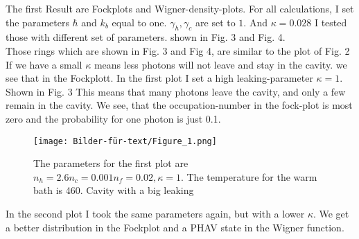 \documentclass[12pt,a4paper]{article}
\begin{document}
The first Result are Fockplots and Wigner-density-plots.
For all calculations, I set the parameters  $\hbar$ and $k_b$ equal to one. $\gamma_h, \gamma_c $ are set to $ 1$. And $\kappa=0.028$
I tested those with different set of parameters. 
shown in Fig. 3 and Fig. 4.\\
Those rings which are shown in Fig. 3 and Fig 4, are similar to the plot of Fig. 2
If we have a small $\kappa$ means less photons will not leave and stay in the cavity. we see that in the Fockplott.
In the first plot I set a high leaking-parameter $\kappa=1$. Shown in Fig. 3
This means that many photons leave the cavity, and only a few remain in the cavity. 
We see, that the occupation-number in the fock-plot is most zero and the probability for one photon is just 0.1.

\begin{figure}[hbtp]
\centering
\texttt{[image: Bilder-für-text/Figure\_1.png]}
\caption{The parameters for the first plot are$ n_h=2.6 n_c=0.001 n_f=0.02,\kappa=1$. The temperature for the warm bath is 460. Cavity with a big leaking}
\end{figure}\newpage

In the second plot I took the same parameters again, but with a lower $\kappa$. We get a better distribution in the Fockplot and a PHAV state in the Wigner function. 
\end{document}
